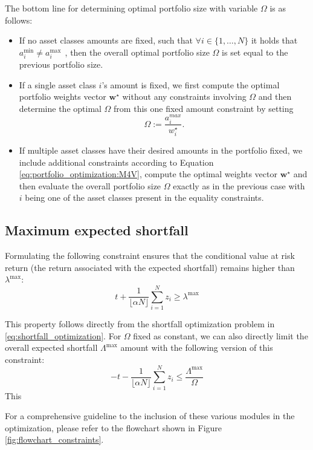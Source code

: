 The bottom line for determining optimal portfolio size with variable $\Omega$ is as follows:
\begin{itemize}
	\item If no asset classes amounts are fixed, such that $\forall i\in\{1,\ldots,N\}$ it holds that $a^{\min}_i \neq a^{\max}_i \ \ $, then the overall optimal portfolio size $\Omega$ is set equal to the previous portfolio size.
	\item If a single asset class $i$'s amount is fixed, we first compute the optimal portfolio weights vector $\mathbf{w^\star}$ without any constraints involving $\Omega$ and then determine the optimal $\Omega$ from this one fixed amount constraint by setting
	\begin{equation}
		\Omega := \frac{a^{max}_i}{w^\star_i}. 
	\end{equation}
	\item If multiple asset classes have their desired amounts in the portfolio fixed, we include additional constraints according to Equation \ref{eq:portfolio_optimization:M4V}, compute the optimal weights vector $\mathbf{w^\star}$ and then evaluate the overall portfolio size $\Omega$ exactly as in the previous case with $i$ being one of the asset classes present in the equality constraints.
\end{itemize}

\subsection{Maximum expected shortfall}
	
Formulating the following constraint ensures that the conditional value at risk return (the return associated with the expected shortfall) remains higher than $\lambda^{\max}$:
\begin{equation}
 t + \frac{1}{\lfloor{\alpha N}\rfloor} \sum_{i=1}^{N} z_i \geq \lambda^{\max} \tag{M5}
\end{equation}

This property follows directly from the shortfall optimization problem in \ref{eq:shortfall_optimization}. For $\Omega$ fixed as constant, we can also directly limit the overall expected shortfall $\Lambda^{\max}$ amount with the following version of this constraint:
\begin{equation}
 - t - \frac{1}{\lfloor{\alpha N}\rfloor} \sum_{i=1}^{N} z_i \leq \frac{\Lambda^{\max}}{\Omega} \tag{M5F}
\end{equation}
This 

For a comprehensive guideline to the inclusion of these various modules in the optimization, please refer to the flowchart shown in Figure \ref{fig:flowchart_constraints}.


